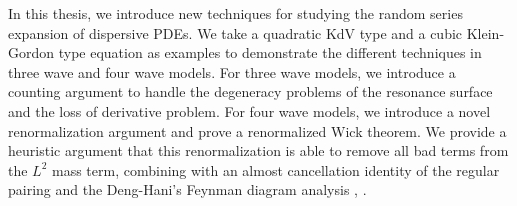 In this thesis, we introduce new techniques for studying the random series expansion of dispersive PDEs. We take a quadratic KdV type and a cubic Klein-Gordon type equation as examples to demonstrate the different techniques in three wave and four wave models. For three wave models, we introduce a counting argument to handle the degeneracy problems of the resonance surface and the loss of derivative problem. For four wave models, we introduce a novel renormalization argument and prove a renormalized Wick theorem. We provide a heuristic argument that this renormalization is able to remove all bad terms from the $L^2$ mass term, combining with an almost cancellation identity of the regular pairing and the Deng-Hani's Feynman diagram analysis \cite{deng2021full}, \cite{deng2023derivation}. 